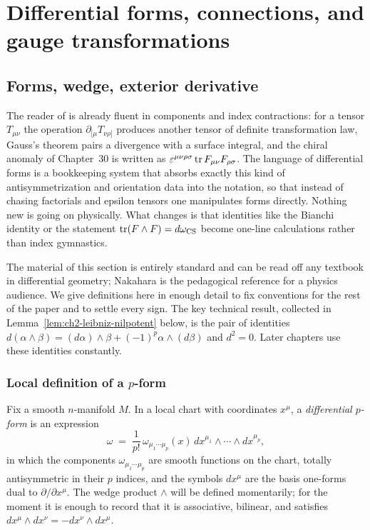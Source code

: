 \chapter{Differential forms, connections, and gauge transformations}\label{ch:forms}

\section{Forms, wedge, exterior derivative}\label{sec:forms-basics}

The reader of \cite{Schwartz2014QFT} is already fluent in components and index contractions: for a tensor $T_{\mu\nu}$ the operation $\partial_{[\mu}T_{\nu\rho]}$ produces another tensor of definite transformation law, Gauss's theorem pairs a divergence with a surface integral, and the chiral anomaly of Chapter~30 is written as $\varepsilon^{\mu\nu\rho\sigma}\operatorname{tr} F_{\mu\nu}F_{\rho\sigma}$. The language of differential forms is a bookkeeping system that absorbs exactly this kind of antisymmetrization and orientation data into the notation, so that instead of chasing factorials and epsilon tensors one manipulates forms directly. Nothing new is going on physically. What changes is that identities like the Bianchi identity or the statement $\operatorname{tr}(F\wedge F) = d\omega_{\operatorname{CS}}$ become one-line calculations rather than index gymnastics.

\medskip

\noindent The material of this section is entirely standard and can be read off any textbook in differential geometry; Nakahara \cite{Nakahara2003GTP} is the pedagogical reference for a physics audience. We give definitions here in enough detail to fix conventions for the rest of the paper and to settle every sign. The key technical result, collected in Lemma~\ref{lem:ch2-leibniz-nilpotent} below, is the pair of identities $d(\alpha\wedge\beta) = (d\alpha)\wedge\beta + (-1)^p\alpha\wedge(d\beta)$ and $d^2 = 0$. Later chapters use these identities constantly.

\subsection{Local definition of a $p$-form}

Fix a smooth $n$-manifold $M$. In a local chart with coordinates $x^\mu$, a \emph{differential $p$-form} is an expression
\begin{equation}\label{eq:form-local}
\omega \;=\; \frac{1}{p!}\,\omega_{\mu_1\cdots\mu_p}(x)\,dx^{\mu_1}\wedge\cdots\wedge dx^{\mu_p},
\end{equation}
in which the components $\omega_{\mu_1\cdots\mu_p}$ are smooth functions on the chart, totally antisymmetric in their $p$ indices, and the symbols $dx^\mu$ are the basis one-forms dual to $\partial/\partial x^\mu$. The wedge product $\wedge$ will be defined momentarily; for the moment it is enough to record that it is associative, bilinear, and satisfies $dx^\mu\wedge dx^\nu = -dx^\nu \wedge dx^\mu$.


